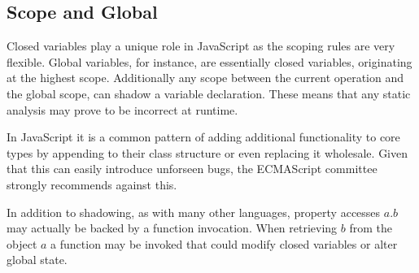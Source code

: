 \subsection{Scope and Global}

Closed variables play a unique role in JavaScript as the scoping rules are very flexible.  Global variables, for instance, are essentially closed variables, originating at the highest scope.  Additionally any scope between the current operation and the global scope, can shadow a variable declaration.  These means that any static analysis may prove to be incorrect at runtime.  

In JavaScript it is a common pattern of adding additional functionality to core types by appending to their class structure or even replacing it wholesale.  Given that this can easily introduce unforseen bugs, the ECMAScript committee strongly recommends against this. %

In addition to shadowing, as with many other languages, property accesses $a.b$ may actually be backed by a function invocation.  When retrieving $b$ from the object $a$ a function may be invoked that could modify closed variables or alter global state.  